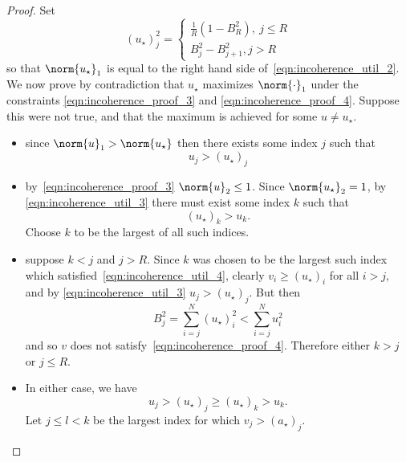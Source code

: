 \documentclass{article}
\newcommand{\1}{\mathbf{1}}
\theoremstyle{alden}
\theoremstyle{aldenthm}
\theoremstyle{definition}
\theoremstyle{remark}
\begin{document}
\begin{proof}
	Set
	\begin{equation*}
	(u_\star)_j^2 = 
	\begin{cases*}
	\frac{1}{R}(1 - B_R^2), ~ j \leq R \\
	B_j^2 - B_{j + 1}^2, j > R
	\end{cases*}
	\end{equation*}
	so that $\norm{u_\star}_1$ is equal to the right hand side of~\eqref{eqn:incoherence_util_2}. We now prove by contradiction that $u_\star$ maximizes $\norm{\cdot}_1$ under the constraints \eqref{eqn:incoherence_proof_3} and \eqref{eqn:incoherence_proof_4}. Suppose this were not true, and that the maximum is achieved for some $u \neq u_{\star}$.
	\begin{itemize}
		\item since $\norm{u}_1 > \norm{u_{\star}}$ then there exists some index $j$ such that
		\begin{equation}
		\label{eqn:incoherence_util_3}
		u_j > (u_{\star})_j
		\end{equation} 
		\item by~\eqref{eqn:incoherence_proof_3} $\norm{u}_2 \leq 1$. Since $\norm{u_{\star}}_2 = 1$, by \eqref{eqn:incoherence_util_3} there must exist some index $k$ such that
		\begin{equation}
		\label{eqn:incoherence_util_4}
		(u_{\star})_k > u_k.
		\end{equation} 
		Choose $k$ to be the largest of all such indices.
		\item suppose $k < j$ and $j > R$. Since $k$ was chosen to be the largest such index which satisfied~\eqref{eqn:incoherence_util_4}, clearly $v_i \geq (u_{\star})_i$ for all $i > j$, and by \eqref{eqn:incoherence_util_3} $u_j > (u_{\star})_j$. But then 
		\begin{equation*}
		B_j^2 = \sum_{i = j}^{N} (u_{\star})_i^2 < \sum_{i = j}^{N} u_i^2 
		\end{equation*}
		and so $v$ does not satisfy~\eqref{eqn:incoherence_proof_4}. Therefore either $k > j$ or $j \leq R$.
		\item In either case, we have
		\begin{equation*}
		u_j > (u_{\star})_j \geq (u_{\star})_k > u_k.
		\end{equation*}
		Let $j \leq l < k$ be the largest index for which $v_j > (a_{\star})_j$. 
		

\end{itemize}
\end{proof}
\end{document}
